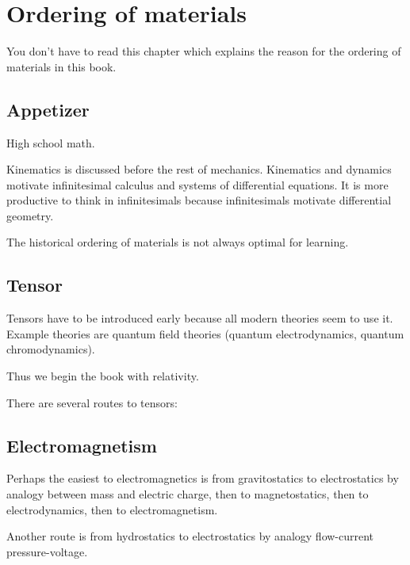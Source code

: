 \chapter{Ordering of materials}

You don't have to read this chapter which
explains the reason for the ordering of materials in this book.

\section{Appetizer}

High school math.

Kinematics is discussed before the rest of mechanics.
Kinematics and dynamics motivate infinitesimal calculus and systems of differential equations.
It is more productive to think in infinitesimals because infinitesimals motivate differential geometry.

The historical ordering of materials is not always optimal for learning.

\section{Tensor}

Tensors have to be introduced early because all modern theories seem to use it.
Example theories are quantum field theories (quantum electrodynamics, quantum chromodynamics).

Thus we begin the book with relativity.

There are several routes to tensors:


\section{Electromagnetism}

Perhaps the easiest to electromagnetics is
from gravitostatics to electrostatics by analogy between mass and electric charge,
then to magnetostatics,
then to electrodynamics,
then to electromagnetism.

Another route is from hydrostatics to electrostatics by analogy flow-current pressure-voltage.

